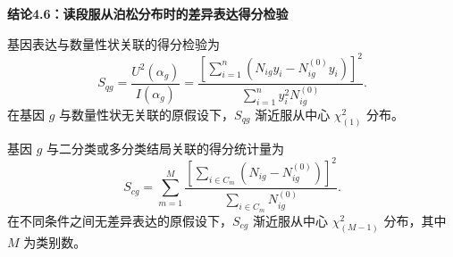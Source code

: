 \par\medskip{}
\noindent\textbf{结论4.6：读段服从泊松分布时的差异表达得分检验}\par
基因表达与数量性状关联的得分检验为
\begin{equation}
S_{qg}=\frac{U^2(\alpha_g)}{I(\alpha_g)}
=\frac{\left[\sum_{i=1}^{n}(N_{ig}y_i-N_{ig}^{(0)}y_i)\right]^2}{\sum_{i=1}^{n}y_i^2N_{ig}^{(0)}}.
\tag{4.91}
\end{equation}
在基因 $g$ 与数量性状无关联的原假设下，$S_{qg}$ 渐近服从中心 $\chi^2_{(1)}$ 分布。

基因 $g$ 与二分类或多分类结局关联的得分统计量为
\begin{equation}
S_{cg}=\sum_{m=1}^{M}\frac{\left[\sum_{i\in C_m}(N_{ig}-N_{ig}^{(0)})\right]^2}{\sum_{i\in C_m}N_{ig}^{(0)}}.
\tag{4.92}
\end{equation}
在不同条件之间无差异表达的原假设下，$S_{cg}$ 渐近服从中心 $\chi^2_{(M-1)}$ 分布，其中 $M$ 为类别数。
\FloatBarrier
